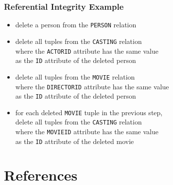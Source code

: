 \documentclass[dvipsnames]{beamer}
\theoremstyle{plain}
\begin{document}
\begin{frame}[fragile]
  \frametitle{Referential Integrity Example}

  \begin{example}
    \begin{itemize}
      \item delete a person from the \texttt{PERSON} relation

      \pause
      \item delete all tuples from the \texttt{CASTING} relation\\
        where the \texttt{ACTORID} attribute has the same value\\
        as the \texttt{ID} attribute of the deleted person

      \pause
      \item delete all tuples from the \texttt{MOVIE} relation\\
        where the \texttt{DIRECTORID} attribute has the same value\\
        as the \texttt{ID} attribute of the deleted person

      \pause
      \item for each deleted \texttt{MOVIE} tuple in the previous step,\\
        delete all tuples from the \texttt{CASTING} relation\\
        where the \texttt{MOVIEID} attribute has the same value\\
        as the \texttt{ID} attribute of the deleted movie

    \end{itemize}
  \end{example}
\end{frame}

\section*{References}
\end{document}
